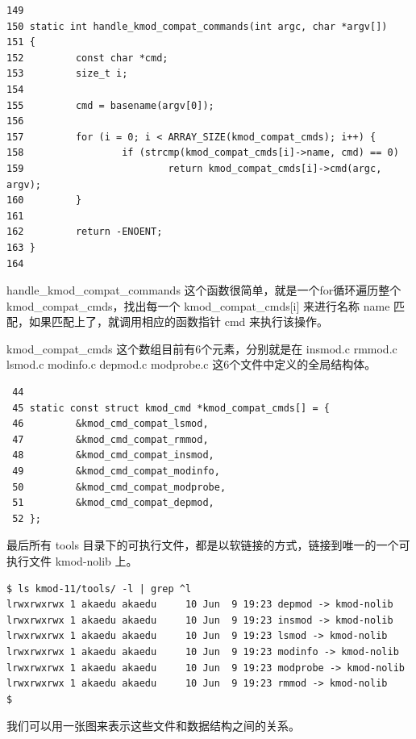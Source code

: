 {\begin{shaded}\begin{verbatim}
149 
150 static int handle_kmod_compat_commands(int argc, char *argv[])
151 {
152         const char *cmd;
153         size_t i;
154 
155         cmd = basename(argv[0]);
156 
157         for (i = 0; i < ARRAY_SIZE(kmod_compat_cmds); i++) {
158                 if (strcmp(kmod_compat_cmds[i]->name, cmd) == 0)
159                         return kmod_compat_cmds[i]->cmd(argc, argv);
160         }
161 
162         return -ENOENT;
163 }
164 
\end{verbatim}\end{shaded}}
handle\_kmod\_compat\_commands 这个函数很简单，就是一个for循环遍历整个
kmod\_compat\_cmds，找出每一个 kmod\_compat\_cmds{[}i{]} 来进行名称 name
匹配，如果匹配上了，就调用相应的函数指针 cmd 来执行该操作。

kmod\_compat\_cmds 这个数组目前有6个元素，分别就是在 insmod.c rmmod.c
lsmod.c modinfo.c depmod.c modprobe.c 这6个文件中定义的全局结构体。

{\begin{shaded}\begin{verbatim}
 44
 45 static const struct kmod_cmd *kmod_compat_cmds[] = {
 46         &kmod_cmd_compat_lsmod,
 47         &kmod_cmd_compat_rmmod,
 48         &kmod_cmd_compat_insmod,
 49         &kmod_cmd_compat_modinfo,
 50         &kmod_cmd_compat_modprobe,
 51         &kmod_cmd_compat_depmod,
 52 };
\end{verbatim}\end{shaded}}
最后所有 tools
目录下的可执行文件，都是以软链接的方式，链接到唯一的一个可执行文件
kmod-nolib 上。

{\begin{shaded}\begin{verbatim}
$ ls kmod-11/tools/ -l | grep ^l
lrwxrwxrwx 1 akaedu akaedu     10 Jun  9 19:23 depmod -> kmod-nolib
lrwxrwxrwx 1 akaedu akaedu     10 Jun  9 19:23 insmod -> kmod-nolib
lrwxrwxrwx 1 akaedu akaedu     10 Jun  9 19:23 lsmod -> kmod-nolib
lrwxrwxrwx 1 akaedu akaedu     10 Jun  9 19:23 modinfo -> kmod-nolib
lrwxrwxrwx 1 akaedu akaedu     10 Jun  9 19:23 modprobe -> kmod-nolib
lrwxrwxrwx 1 akaedu akaedu     10 Jun  9 19:23 rmmod -> kmod-nolib
$ 
\end{verbatim}\end{shaded}}
我们可以用一张图来表示这些文件和数据结构之间的关系。

